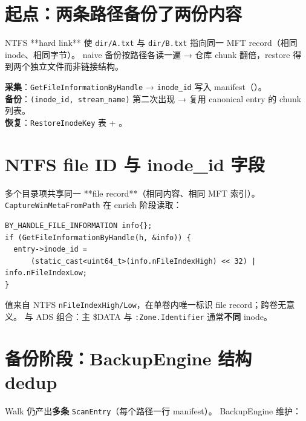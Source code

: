 
\section{起点：两条路径备份了两份内容}

NTFS **hard link** 使 \texttt{dir/A.txt} 与 \texttt{dir/B.txt} 指向同一 MFT record（相同 inode、相同字节）。
 naive 备份按路径各读一遍 → 仓库 chunk 翻倍，restore 得到两个独立文件而非链接结构。

\begin{evolbox}
\textbf{采集}：\texttt{GetFileInformationByHandle} → \texttt{inode\_id} 写入 manifest（）。\\
\textbf{备份}：\texttt{(inode\_id, stream\_name)} 第二次出现 → 复用 canonical entry 的 chunk 列表。\\
\textbf{恢复}：\texttt{RestoreInodeKey} 表 + 。
\end{evolbox}

\section{NTFS file ID 与 inode\_id 字段}

多个目录项共享同一 **file record**（相同内容、相同 MFT 索引）。
\texttt{CaptureWinMetaFromPath} 在 enrich 阶段读取：

\begin{lstlisting}[caption={inode\_id 来源 (win\_meta.cc)}]
BY_HANDLE_FILE_INFORMATION info{};
if (GetFileInformationByHandle(h, &info)) {
  entry->inode_id =
      (static_cast<uint64_t>(info.nFileIndexHigh) << 32) | info.nFileIndexLow;
}
\end{lstlisting}

\begin{apibox}
值来自 NTFS \texttt{nFileIndexHigh/Low}，在单卷内唯一标识 file record；跨卷无意义。
与 ADS 组合：主 \$DATA 与 \texttt{:Zone.Identifier} 通常\textbf{不同} inode。
\end{apibox}

\section{备份阶段：BackupEngine 结构 dedup}

Walk 仍产出\textbf{多条} \texttt{ScanEntry}（每个路径一行 manifest）。
BackupEngine 维护：

